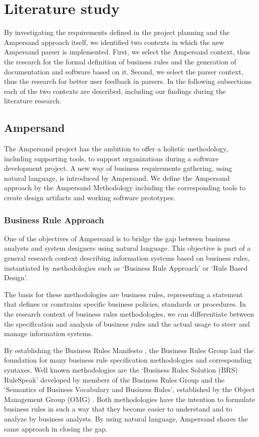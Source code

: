 
\section{Literature study}
\label{sec:literature-study}
By investigating the requirements defined in the project planning  and the Ampersand approach itself, we identified two contexts in which the new Ampersand parser is implemented.
First, we select the Ampersand context, thus the research for the formal definition of business rules and the generation of documentation and software based  on it.
Second, we select the parser context, thus the research for better user feedback in parsers.
In the following subsections each of the two contexts are described, including our findings during the literature research.

\subsection{Ampersand}
The Ampersand project has the ambition to offer a holistic methodology, including supporting tools, to support organizations during a software development project.
A new way of business requirements gathering, using natural language, is introduced by Ampersand.
We define the Ampersand approach by the Ampersand Methodology including the corresponding tools to create design artifacts and working software prototypes.

\subsubsection{Business Rule Approach}
One of  the objectives of Ampersand is to bridge the gap between business analysts and system designers using natural language.
This objective is part of a general research context describing information systems based on business rules, instantiated by methodologies such as `Business Rule Approach' or `Rule Based Design'.

The basis for these methodologies are business rules, representing a statement that defines or constrains specific business policies, standards or procedures.
In the research context of business rules methodologies, we can differentiate between the specification and analysis of business rules and the actual usage to steer and manage information systems.

%
%
By establishing the Business Rules Manifesto , the Business Rules Group laid the foundation for many business rule specification methodologies and corresponding syntaxes.
Well known methodologies are the `Business Rules Solution (BRS) RuleSpeak' developed by members of the Business Rules Group  and the `Semantics of Business Vocabulary and Business Rules', established by the Object Management Group (OMG) .
Both methodologies have the intention to formulate business rules in such a way that they become easier to understand and to analyze by business analysts.
By using natural language, Ampersand shares the same approach in closing the gap.

